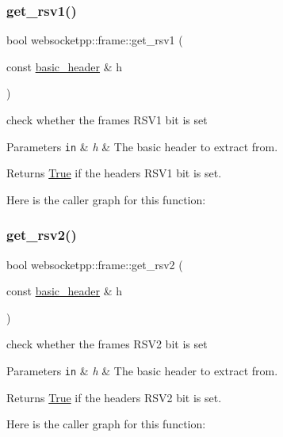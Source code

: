 \subsubsection{\texorpdfstring{get\+\_\+rsv1()}{get\_rsv1()}}
{\footnotesize\ttfamily bool websocketpp\+::frame\+::get\+\_\+rsv1 (\begin{DoxyParamCaption}\item[{const \mbox{\hyperlink{structwebsocketpp_1_1frame_1_1basic__header}{basic\+\_\+header}} \&}]{h }\end{DoxyParamCaption})\hspace{0.3cm}{\ttfamily [inline]}}



check whether the frame\textquotesingle{}s R\+S\+V1 bit is set 


\begin{DoxyParams}[1]{Parameters}
\mbox{\tt in}  & {\em h} & The basic header to extract from. \\
\hline
\end{DoxyParams}
\begin{DoxyReturn}{Returns}
\mbox{\hyperlink{struct_true}{True}} if the header\textquotesingle{}s R\+S\+V1 bit is set. 
\end{DoxyReturn}
Here is the caller graph for this function\+:
\mbox{\label{namespacewebsocketpp_1_1frame_a531509bc14ee0a6641662b17d5670460}} 
\subsubsection{\texorpdfstring{get\+\_\+rsv2()}{get\_rsv2()}}
{\footnotesize\ttfamily bool websocketpp\+::frame\+::get\+\_\+rsv2 (\begin{DoxyParamCaption}\item[{const \mbox{\hyperlink{structwebsocketpp_1_1frame_1_1basic__header}{basic\+\_\+header}} \&}]{h }\end{DoxyParamCaption})\hspace{0.3cm}{\ttfamily [inline]}}



check whether the frame\textquotesingle{}s R\+S\+V2 bit is set 


\begin{DoxyParams}[1]{Parameters}
\mbox{\tt in}  & {\em h} & The basic header to extract from. \\
\hline
\end{DoxyParams}
\begin{DoxyReturn}{Returns}
\mbox{\hyperlink{struct_true}{True}} if the header\textquotesingle{}s R\+S\+V2 bit is set. 
\end{DoxyReturn}
Here is the caller graph for this function\+:
\mbox{\label{namespacewebsocketpp_1_1frame_a4dc0cc35b38986b9b56120ef297dd795}} 
